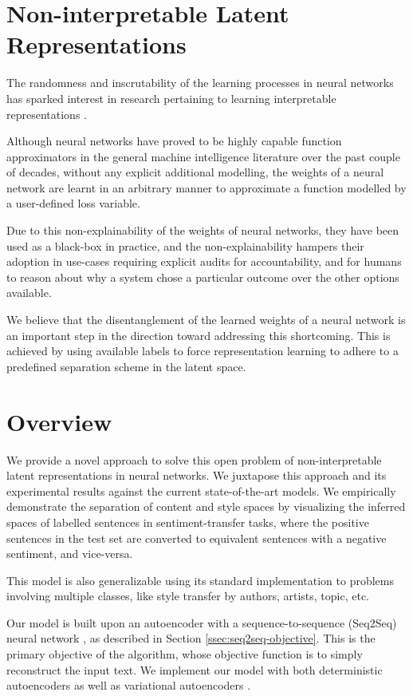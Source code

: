 \section{Non-interpretable Latent Representations}

The randomness and inscrutability of the learning processes in neural networks has sparked interest in research pertaining to learning interpretable representations \citep{chen2016infogan}.

Although neural networks have proved to be highly capable function approximators in the general machine intelligence literature over the past couple of decades, without any explicit additional modelling, the weights of a neural network are learnt in an arbitrary manner to approximate a function modelled by a user-defined loss variable.

Due to this non-explainability of the weights of neural networks, they have been used as a black-box in practice, and the non-explainability hampers their adoption in use-cases requiring explicit audits for accountability, and for humans to reason about why a system chose a particular outcome over the other options available.

We believe that the disentanglement of the learned weights of a neural network is an important step in the direction toward addressing this shortcoming. This is achieved by using available labels to force representation learning to adhere to a predefined separation scheme in the latent space.


\section{Overview}

We provide a novel approach to solve this open problem of non-interpretable latent representations in neural networks. We juxtapose this approach and its experimental results against the current state-of-the-art models. We empirically demonstrate the separation of content and style spaces by visualizing the inferred spaces of labelled sentences in sentiment-transfer tasks, where the positive sentences in the test set are converted to equivalent sentences with a negative sentiment, and vice-versa.

This model is also generalizable using its standard implementation to problems involving multiple classes, like style transfer by authors, artists, topic, etc.

Our model is built upon an autoencoder with a sequence-to-sequence (Seq2Seq) neural network \citep{sutskever2014sequence}, as described in Section \ref{ssec:seq2seq-objective}. This is the primary objective of the algorithm, whose objective function is to simply reconstruct the input text. We implement our model with both deterministic autoencoders \citep{baldi2012autoencoders} as well as variational autoencoders \citep{kingma2013auto}.

